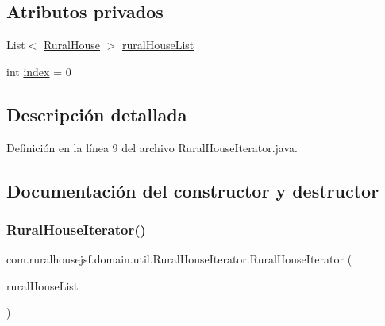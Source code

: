 \subsection*{Atributos privados}
\begin{DoxyCompactItemize}
\item 
List$<$ \mbox{\hyperlink{classcom_1_1ruralhousejsf_1_1domain_1_1_rural_house}{Rural\+House}} $>$ \mbox{\hyperlink{classcom_1_1ruralhousejsf_1_1domain_1_1util_1_1_rural_house_iterator_a86506cdc509d2a232309bdcf939f4d51}{rural\+House\+List}}
\item 
int \mbox{\hyperlink{classcom_1_1ruralhousejsf_1_1domain_1_1util_1_1_rural_house_iterator_a834745c64bea24644840222751eb901a}{index}} = 0
\end{DoxyCompactItemize}


\subsection{Descripción detallada}


Definición en la línea 9 del archivo Rural\+House\+Iterator.\+java.



\subsection{Documentación del constructor y destructor}
\mbox{\label{classcom_1_1ruralhousejsf_1_1domain_1_1util_1_1_rural_house_iterator_aa0a65be50d1149a49a37203d411279d3}} 
\subsubsection{\texorpdfstring{RuralHouseIterator()}{RuralHouseIterator()}}
{\footnotesize\ttfamily com.\+ruralhousejsf.\+domain.\+util.\+Rural\+House\+Iterator.\+Rural\+House\+Iterator (\begin{DoxyParamCaption}\item[{List$<$ \mbox{\hyperlink{classcom_1_1ruralhousejsf_1_1domain_1_1_rural_house}{Rural\+House}} $>$}]{rural\+House\+List }\end{DoxyParamCaption})}



